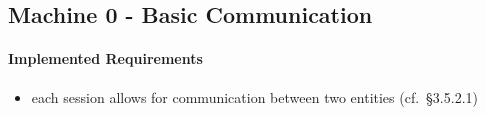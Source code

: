 \documentclass{template/openetcs_article}
\begin{document}
\subsection{Machine 0 - Basic Communication}
\label{sec:machine-0-basic}

\paragraph{Implemented Requirements}
\label{sec:impl-requ}

\begin{itemize}
\item each session allows for communication between two entities (cf.~§3.5.2.1)
\end{itemize}

%





\end{document}
